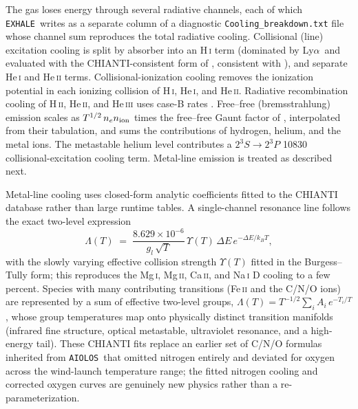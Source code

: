 \documentclass[twocolumn]{aastex702}
\newcommand{\EXHALE}{\texttt{EXHALE}}
\newcommand{\AIOLOS}{\texttt{AIOLOS}}
\newcommand{\Lya}{\mbox{Ly}\ensuremath{\alpha}}
\begin{document}
The gas loses energy through several radiative channels, each of which \EXHALE\ writes as
a separate column of a diagnostic \texttt{Cooling\_breakdown.txt} file whose channel sum
reproduces the total radiative cooling. Collisional (line) excitation cooling is split by
absorber into an \mbox{H\,\textsc{i}} term (dominated by \Lya\ and evaluated with the
CHIANTI-consistent form of \citet{Cen1992}, consistent with \citet{Black1981}), and
separate \mbox{He\,\textsc{i}} and \mbox{He\,\textsc{ii}} terms. Collisional-ionization
cooling removes the ionization potential in each ionizing collision of \mbox{H\,\textsc{i}},
\mbox{He\,\textsc{i}}, and \mbox{He\,\textsc{ii}}. Radiative recombination cooling of
\mbox{H\,\textsc{ii}}, \mbox{He\,\textsc{ii}}, and \mbox{He\,\textsc{iii}} uses case-B
rates \citep{HuiGnedin1997}. Free--free (bremsstrahlung) emission scales as
$T^{1/2}\,n_e n_{\rm ion}$ times the free--free Gaunt factor of \citet{vanHoof2014},
interpolated from their tabulation, and sums the contributions of hydrogen, helium, and
the metal ions. The metastable helium level
contributes a $2^{3}S\to2^{3}P$ 10830 collisional-excitation cooling term. Metal-line
emission is treated as described next.

Metal-line cooling uses closed-form analytic coefficients fitted to the CHIANTI database
\citep{Dere1997,DelZanna2021} rather than large runtime tables. A single-channel
resonance line follows the exact two-level expression
\begin{equation}
\Lambda(T) \;=\; \frac{8.629\times10^{-6}}{g_l\,\sqrt{T}}\,
\Upsilon(T)\,\Delta E\,e^{-\Delta E/k_BT},
\end{equation}
with the slowly varying effective collision strength $\Upsilon(T)$ fitted in the
Burgess--Tully form; this reproduces the \mbox{Mg\,\textsc{i}}, \mbox{Mg\,\textsc{ii}},
\mbox{Ca\,\textsc{ii}}, and \mbox{Na\,\textsc{i}} D cooling to a few percent. Species with
many contributing transitions (\mbox{Fe\,\textsc{ii}} and the C/N/O ions) are
represented by a sum of effective two-level groups,
$\Lambda(T)=T^{-1/2}\sum_i A_i\,e^{-T_i/T}$, whose group temperatures map onto physically
distinct transition manifolds (infrared fine structure, optical metastable, ultraviolet
resonance, and a high-energy tail). These CHIANTI fits replace an earlier set of C/N/O
formulas inherited from \AIOLOS\ that omitted nitrogen entirely and deviated for oxygen
across the wind-launch temperature range; the fitted nitrogen cooling and corrected
oxygen curves are genuinely new physics rather than a re-parameterization.
\end{document}
